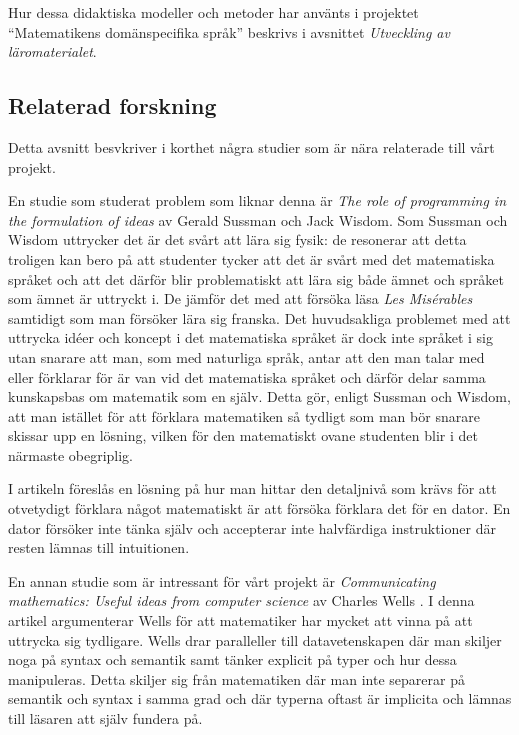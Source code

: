 \documentclass[12pt,a4paper,twoside,openright]{article}
\begin{document}
Hur dessa didaktiska modeller och metoder har använts i projektet
``Matematikens domänspecifika språk'' beskrivs i avsnittet
\textit{Utveckling av läromaterialet}.

\subsection{Relaterad forskning}
\label{sec:relForsk}
Detta avsnitt besvkriver i korthet några studier som
är nära relaterade till vårt projekt.

En studie som studerat problem som liknar denna är \textit{The role of
  programming in the formulation of ideas} \cite{sussman2002role} av
Gerald Sussman och Jack Wisdom.  Som Sussman och Wisdom uttrycker det
är det svårt att lära sig fysik: de resonerar att detta troligen kan
bero på att studenter tycker att det är svårt med det matematiska
språket och att det därför blir problematiskt att lära sig både ämnet
och språket som ämnet är uttryckt i. De jämför det med att försöka
läsa \textit{Les Misérables} samtidigt som man försöker lära sig
franska. Det huvudsakliga problemet med att uttrycka idéer och koncept
i det matematiska språket är dock inte språket i sig utan snarare att
man, som med naturliga språk, antar att den man talar med eller
förklarar för är van vid det matematiska språket och därför delar
samma kunskapsbas om matematik som en själv. Detta gör, enligt Sussman
och Wisdom, att man istället för att förklara matematiken så tydligt
som man bör snarare skissar upp en lösning, vilken för den matematiskt
ovane studenten blir i det närmaste obegriplig.

I artikeln föreslås en lösning på hur man hittar den detaljnivå som
krävs för att otvetydigt förklara något matematiskt är att försöka
förklara det för en dator. En dator försöker inte tänka själv och
accepterar inte halvfärdiga instruktioner där resten lämnas till
intuitionen.

En annan studie som är intressant för vårt projekt är
\textit{Communicating mathematics: Useful ideas from computer science}
av Charles Wells \cite{wells1995communicating}. I denna artikel
argumenterar Wells för att matematiker har mycket att vinna på att
uttrycka sig tydligare. Wells drar paralleller till datavetenskapen
där man skiljer noga på syntax och semantik samt tänker explicit på
typer och hur dessa manipuleras. Detta skiljer sig från matematiken
där man inte separerar på semantik och syntax i samma grad och där
typerna oftast är implicita och lämnas till läsaren att själv fundera
på.
\end{document}
